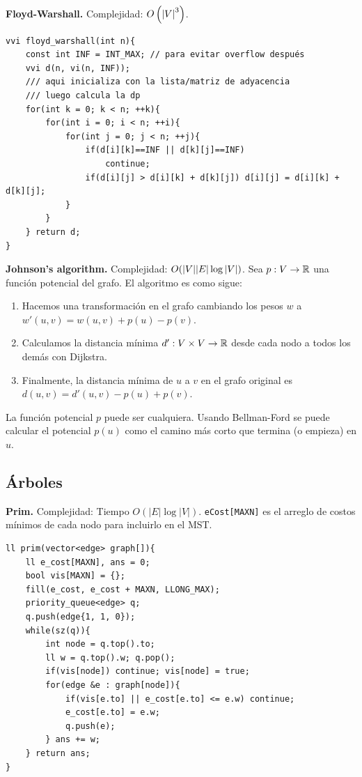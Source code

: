 \textbf{Floyd-Warshall.} Complejidad: $O\left( \abs{V}^3 \right)$.
\begin{verbatim}
vvi floyd_warshall(int n){
    const int INF = INT_MAX; // para evitar overflow después
    vvi d(n, vi(n, INF));
    /// aqui inicializa con la lista/matriz de adyacencia
    /// luego calcula la dp
    for(int k = 0; k < n; ++k){
        for(int i = 0; i < n; ++i){
            for(int j = 0; j < n; ++j){
                if(d[i][k]==INF || d[k][j]==INF)
                    continue;
                if(d[i][j] > d[i][k] + d[k][j]) d[i][j] = d[i][k] + d[k][j];
            }
        }
    } return d;
}
\end{verbatim}



\textbf{Johnson's algorithm.} Complejidad: $O(\abs{V}\abs{E}\log\abs{V})$. Sea $p: V \to \mathbb{R}$ una función potencial del grafo. El algoritmo es como sigue:
\begin{enumerate}[1.]
    \item Hacemos una transformación en el grafo cambiando los pesos $w$ a $w'(u, v) = w(u, v) + p(u) - p(v)$.
    \item Calculamos la distancia mínima $d': V \times V \to \mathbb{R}$ desde cada nodo a todos los demás con Dijkstra.
    \item Finalmente, la distancia mínima de $u$ a $v$ en el grafo original es $d(u, v) = d'(u, v) - p(u) + p(v)$.
\end{enumerate}
La función potencial $p$ puede ser cualquiera. Usando Bellman-Ford se puede calcular el potencial $p(u)$ como el camino más corto que termina (o empieza) en $u$.


\subsection{Árboles}
\textbf{Prim.} Complejidad: Tiempo $O(|E| \log |V|)$. \texttt{eCost[MAXN]} es el arreglo de costos mínimos de cada nodo para incluirlo en el MST.
\begin{verbatim}
ll prim(vector<edge> graph[]){
    ll e_cost[MAXN], ans = 0;
    bool vis[MAXN] = {};
    fill(e_cost, e_cost + MAXN, LLONG_MAX);
    priority_queue<edge> q;
    q.push(edge{1, 1, 0});
    while(sz(q)){
        int node = q.top().to;
        ll w = q.top().w; q.pop();
        if(vis[node]) continue; vis[node] = true;
        for(edge &e : graph[node]){
            if(vis[e.to] || e_cost[e.to] <= e.w) continue;
            e_cost[e.to] = e.w;
            q.push(e);
        } ans += w;
    } return ans;
}
\end{verbatim}



